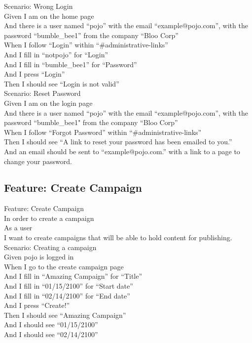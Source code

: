 \documentclass[12pt]{article}
\begin{document}
Scenario: Wrong Login \\
  Given I am on the home page \\
  And there is a user named ``pojo'' with the email ``example@pojo.com'', with the password ``bumble\_bee1'' from the company ``Bloo Corp'' \\
  When I follow ``Login'' within ``\#administrative-links'' \\
  And I fill in ``notpojo'' for ``Login'' \\
  And I fill in ``bumble\_bee1'' for ``Password'' \\
  And I press ``Login'' \\
  Then I should see ``Login is not valid'' \\

Scenario: Reset Password \\
  Given I am on the login page \\
  And there is a user named ``pojo'' with the email ``example@pojo.com'', with the password ``bumble\_bee1" from the company ``Bloo Corp'' \\
  When I follow ``Forgot Password'' within ``\#administrative-links'' \\
  Then I should see ``A link to reset your password has been emailed to you.'' \\
  And an email should be sent to ``example@pojo.com.'' with a link to a page to change your password. \\

\subsection{Feature: Create Campaign}

Feature: Create Campaign \\
In order to create a campaign \\
As a user \\
I want to create campaigns that will be able to hold content for publishing. \\

Scenario: Creating a campaign \\
Given pojo is logged in \\
When I go to the create campaign page \\
And I fill in ``Amazing Campaign'' for ``Title'' \\
And I fill in ``01/15/2100'' for ``Start date'' \\
And I fill in ``02/14/2100'' for ``End date''   \\
And I press ``Create!'' \\
Then I should see ``Amazing Campaign'' \\
And I should see ``01/15/2100'' \\
And I should see ``02/14/2100'' \\
\end{document}
